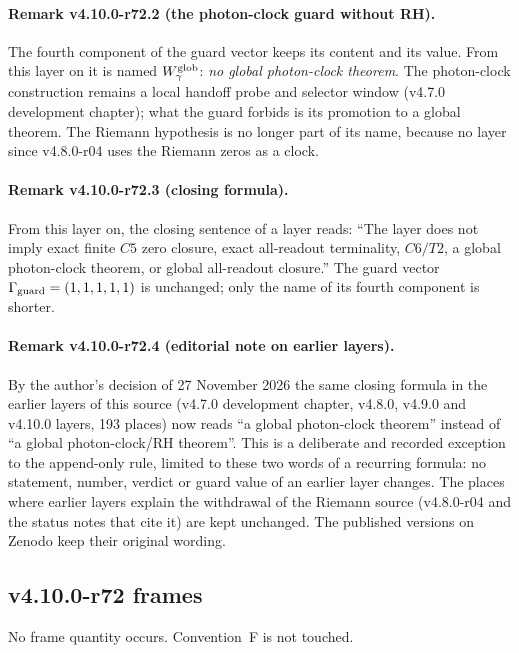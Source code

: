 \paragraph{Remark v4.10.0-r72.2 (the photon-clock guard without RH).}
The fourth component of the guard vector keeps its content and its value.  From this layer on it is named
\(W_\gamma^{\rm glob}\): \emph{no global photon-clock theorem}.  The photon-clock construction remains a local handoff probe and
selector window (v4.7.0 development chapter); what the guard forbids is its promotion to a global theorem.  The Riemann
hypothesis is no longer part of its name, because no layer since v4.8.0-r04 uses the Riemann zeros as a clock.

\paragraph{Remark v4.10.0-r72.3 (closing formula).}
From this layer on, the closing sentence of a layer reads: ``The layer does not imply exact finite \(C5\) zero closure, exact
all-readout terminality, \(C6/T2\), a global photon-clock theorem, or global all-readout closure.''  The guard vector
\(\Gamma_{\rm guard}=(1,1,1,1,1)\) is unchanged; only the name of its fourth component is shorter.

\paragraph{Remark v4.10.0-r72.4 (editorial note on earlier layers).}
By the author's decision of 27 November 2026 the same closing formula in the earlier layers of this source (v4.7.0 development
chapter, v4.8.0, v4.9.0 and v4.10.0 layers, 193 places) now reads ``a global photon-clock theorem'' instead of ``a global
photon-clock/RH theorem''.  This is a deliberate and recorded exception to the append-only rule, limited to these two words of a
recurring formula: no statement, number, verdict or guard value of an earlier layer changes.  The places where earlier layers
explain the withdrawal of the Riemann source (v4.8.0-r04 and the status notes that cite it) are kept unchanged.  The published
versions on Zenodo keep their original wording.

\subsection*{v4.10.0-r72 frames}
\label{subsec:v4100-r72-frames}

No frame quantity occurs.  Convention~F is not touched.

